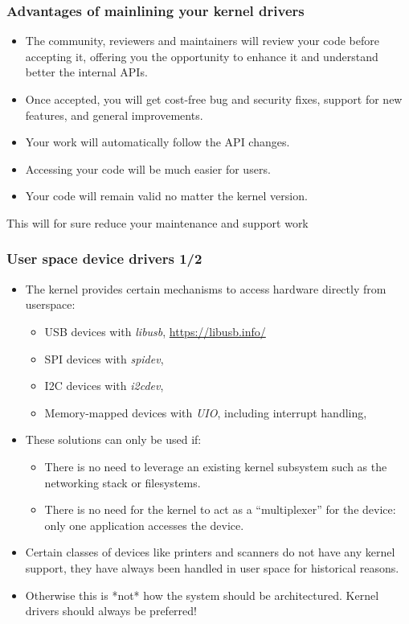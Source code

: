 \begin{frame}
  \frametitle{Advantages of mainlining your kernel drivers}
  \begin{itemize}
  \item The community, reviewers and maintainers will review your code
    before accepting it, offering you the opportunity to enhance it and
    understand better the internal APIs.
  \item Once accepted, you will get cost-free bug and security fixes,
    support for new features, and general improvements.
  \item Your work will automatically follow the API changes.
  \item Accessing your code will be much easier for users.
  \item Your code will remain valid no matter the kernel version.
  \end{itemize}
  This will for sure reduce your maintenance and support work
\end{frame}

\begin{frame}
  \frametitle{User space device drivers 1/2}
  \begin{itemize}
  \item The kernel provides certain mechanisms to access hardware
    directly from userspace:
    \begin{itemize}
    \item USB devices with {\em libusb}, \url{https://libusb.info/}
    \item SPI devices with {\em spidev}, 
    \item I2C devices with {\em i2cdev}, 
    \item Memory-mapped devices with {\em UIO}, including interrupt
      handling, 
    \end{itemize}
  \item These solutions can only be used if:
    \begin{itemize}
    \item There is no need to leverage an existing kernel subsystem
      such as the networking stack or filesystems.
    \item There is no need for the kernel to act as a ``multiplexer''
      for the device: only one application accesses the device.
    \end{itemize}
  \item Certain classes of devices like printers and scanners do not
    have any kernel support, they have always been handled in user space
    for historical reasons.
  \item Otherwise this is *not* how the system should be
    architectured. Kernel drivers should always be preferred!
  \end{itemize}
\end{frame}


